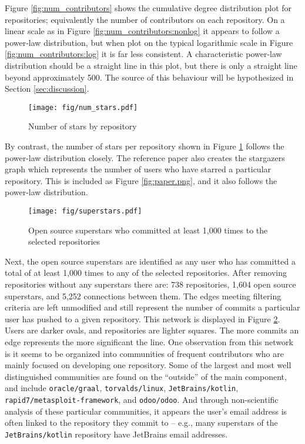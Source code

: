 \documentclass[11pt]{article}
\begin{document}
Figure \ref{fig:num_contributors} shows the cumulative degree distribution plot for repositories; equivalently the number of contributors on each repository. On a linear scale as in Figure \ref{fig:num_contributors:nonlog} it appears to follow a power-law distribution, but when plot on the typical logarithmic scale in Figure \ref{fig:num_contributors:log} it is far less consistent. A characteristic power-law distribution should be a straight line in this plot, but there is only a straight line beyond approximately 500. The source of this behaviour will be hypothesized in Section \ref{sec:discussion}.

\begin{figure}[H]
  \centering
  \texttt{[image: fig/num\_stars.pdf]}
  \caption{Number of stars by repository}
  \label{fig:num_stars}
\end{figure}

By contrast, the number of stars per repository shown in Figure \ref{fig:num_stars} follows the power-law distribution closely. The reference paper \cite{paper} also creates the stargazers graph which represents the number of users who have starred a particular repository. This is included as Figure \ref{fig:paper.png}, and it also follows the power-law distribution.

\begin{figure}[H]
  \centering
  \texttt{[image: fig/superstars.pdf]}
  \caption{Open source superstars who committed at least 1,000 times to the selected repositories}
  \label{fig:superstars}
\end{figure}

Next, the open source superstars are identified as any user who has committed a total of at least 1,000 times to any of the selected repositories. After removing repositories without any superstars there are: 738 repositories, 1,604 open source superstars, and 5,252 connections between them. The edges meeting filtering criteria are left unmodified and still represent the number of commits a particular user has pushed to a given repository. This network is displayed in Figure \ref{fig:superstars}. Users are darker ovals, and repositories are lighter squares. The more commits an edge represents the more significant the line. One observation from this network is it seems to be organized into communities of frequent contributors who are mainly focused on developing one repository. Some of the largest and most well distinguished communities are found on the ``outside'' of the main component, and include \texttt{oracle/graal}, \texttt{torvalds/linux}, \texttt{JetBrains/kotlin}, \texttt{rapid7/metasploit-framework}, and \texttt{odoo/odoo}. And through non-scientific analysis of these particular communities, it appears the user's email address is often linked to the repository they commit to -- e.g., many superstars of the \texttt{JetBrains/kotlin} repository have JetBrains email addresses.
\end{document}
